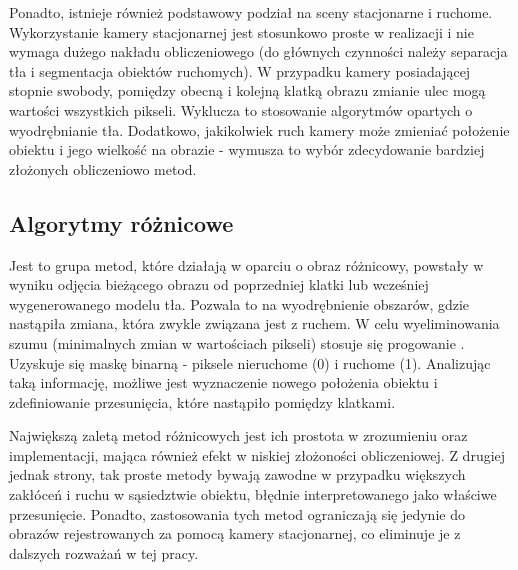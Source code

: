 Ponadto, istnieje również podstawowy podział na sceny stacjonarne i ruchome. 
Wykorzystanie kamery stacjonarnej jest stosunkowo proste w realizacji i nie wymaga dużego nakładu obliczeniowego (do głównych czynności należy separacja tła i segmentacja obiektów ruchomych). %
W przypadku kamery posiadającej stopnie swobody, pomiędzy obecną i kolejną klatką obrazu zmianie ulec mogą wartości wszystkich pikseli. %
Wyklucza to stosowanie algorytmów opartych o wyodrębnianie tła. 
Dodatkowo, jakikolwiek ruch kamery może zmieniać położenie obiektu i jego wielkość na obrazie - wymusza to wybór zdecydowanie bardziej złożonych obliczeniowo metod. %

\subsection{Algorytmy różnicowe}

Jest to grupa metod, które działają w oparciu o obraz różnicowy, powstały w wyniku odjęcia bieżącego obrazu od poprzedniej klatki lub wcześniej wygenerowanego modelu tła. %
Pozwala to na wyodrębnienie obszarów, gdzie nastąpiła zmiana, która zwykle związana jest z ruchem. %
W celu wyeliminowania szumu (minimalnych zmian w wartościach pikseli) stosuje się progowanie \cite{Rosin}. 
Uzyskuje się maskę binarną - piksele nieruchome (0) i ruchome (1). 
Analizując taką informację, możliwe jest wyznaczenie nowego położenia obiektu i zdefiniowanie przesunięcia, które nastąpiło pomiędzy klatkami. 

Największą zaletą metod różnicowych jest ich prostota w zrozumieniu oraz implementacji, mająca również efekt w niskiej złożoności obliczeniowej. 
Z drugiej jednak strony, tak proste metody bywają zawodne w przypadku większych zakłóceń i ruchu w sąsiedztwie obiektu, błędnie interpretowanego jako właściwe przesunięcie. 
Ponadto, zastosowania tych metod ograniczają się jedynie do obrazów rejestrowanych za pomocą kamery stacjonarnej, co eliminuje je z dalszych rozważań w tej pracy. 


